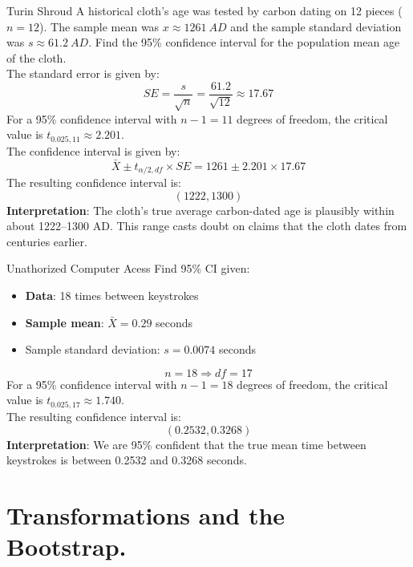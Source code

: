 \documentclass[10pt]{extarticle}
\begin{document}
\begin{examplebox}{Turin Shroud}{}
    A historical cloth's age was tested by carbon dating on 12 pieces ($n = 12$). The sample mean was $x \approx 1261 \ AD$ and the sample standard deviation was $s \approx 61.2 \ AD$. Find the 95\% confidence interval for the population mean age of the cloth. \\[2ex]
    The standard error is given by:
    $$SE = \frac{s}{\sqrt{n}} = \frac{61.2}{\sqrt{12}} \approx 17.67$$
    For a 95\% confidence interval with $n-1 = 11$ degrees of freedom, the critical value is $t_{0.025, 11} \approx 2.201$.\\
    The confidence interval is given by:
    $$\bar{X} \pm t_{\alpha/2, df} \times SE = 1261 \pm 2.201 \times 17.67$$
    The resulting confidence interval is:
    $$(1222, 1300)$$
    \textbf{Interpretation}: The cloth’s true average carbon-dated age is plausibly within about 1222–1300 AD. This range casts doubt on claims that the cloth dates from centuries earlier.
\end{examplebox}
\begin{examplebox}{Unathorized Computer Acess}{}
    Find 95\% CI given:
    \begin{itemize}
        \item \textbf{Data}: 18 times between keystrokes 
        \item \textbf{Sample mean}: $\bar{X} = 0.29$ seconds
        \item Sample standard deviation: $s = 0.0074$ seconds
    \end{itemize}
    $$n  = 18 \Rightarrow df = 17$$
    For a 95\% confidence interval with $n-1 = 18$ degrees of freedom, the critical value is $t_{0.025, 17} \approx 1.740$.\\
    The resulting confidence interval is:
    $$(0.2532, 0.3268)$$
    \textbf{Interpretation}: We are 95\% confident that the true mean time between keystrokes is between 0.2532 and 0.3268 seconds.
\end{examplebox}
\section{Transformations and the Bootstrap.}
\end{document}
